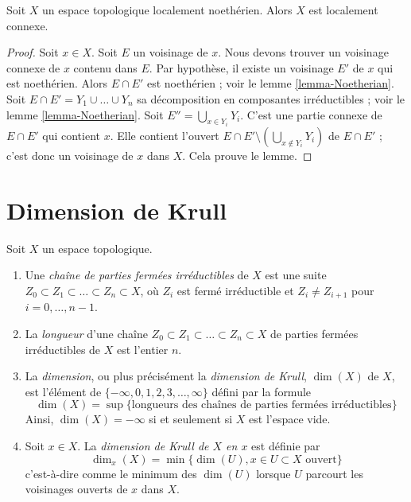 \begin{lemma}
\label{lemma-locally-Noetherian-locally-connected}
Soit $X$ un espace topologique localement noethérien.
Alors $X$ est localement connexe.
\end{lemma}

\begin{proof}
Soit $x \in X$. Soit $E$ un voisinage de $x$.
Nous devons trouver un voisinage connexe de $x$ contenu dans $E$.
Par hypothèse, il existe un voisinage $E'$ de $x$ qui est noethérien.
Alors $E \cap E'$ est noethérien ; voir le lemme \ref{lemma-Noetherian}.
Soit $E \cap E' = Y_1 \cup \ldots \cup Y_n$ sa décomposition en composantes
irréductibles ; voir le lemme \ref{lemma-Noetherian}.
Soit $E'' = \bigcup_{x \in Y_i} Y_i$. C'est une partie connexe de
$E \cap E'$ qui contient $x$. Elle contient l'ouvert
$E \cap E' \setminus (\bigcup_{x \not \in Y_i} Y_i)$ de $E \cap E'$ ; c'est
donc un voisinage de $x$ dans $X$. Cela prouve le lemme.
\end{proof}




\section{Dimension de Krull}
\label{section-krull-dimension}

\begin{definition}
\label{definition-Krull}
Soit $X$ un espace topologique.
\begin{enumerate}
\item Une {\it chaîne de parties fermées irréductibles} de $X$ est une suite
$Z_0 \subset Z_1 \subset \ldots \subset Z_n \subset X$, où $Z_i$ est fermé
irréductible et $Z_i \not = Z_{i + 1}$ pour $i = 0, \ldots, n - 1$.
\item La {\it longueur} d'une chaîne
$Z_0 \subset Z_1 \subset \ldots \subset Z_n \subset X$ de parties fermées
irréductibles de $X$ est l'entier $n$.
\item La {\it dimension}, ou plus précisément la {\it dimension de Krull},
$\dim(X)$ de $X$, est l'élément de
$\{-\infty, 0, 1, 2, 3, \ldots, \infty\}$ défini par la formule
$$
\dim(X) =
\sup \{\text{longueurs des chaînes de parties fermées irréductibles}\}
$$
Ainsi, $\dim(X) = -\infty$ si et seulement si $X$ est l'espace vide.
\item Soit $x \in X$. La {\it dimension de Krull de $X$ en $x$} est définie
par
$$
\dim_x(X) = \min \{\dim(U), x\in U\subset X\text{ ouvert}\}
$$
c'est-à-dire comme le minimum des $\dim(U)$ lorsque $U$ parcourt les
voisinages ouverts de $x$ dans $X$.
\end{enumerate}
\end{definition}

